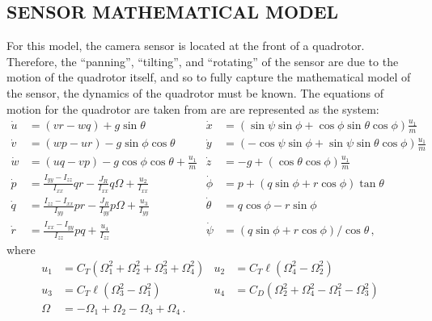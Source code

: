 \documentclass[11pt]{article}
\begin{document}
\subsection{SENSOR MATHEMATICAL MODEL}
For this model, the camera sensor is located at the front of a quadrotor. Therefore, the ``panning'', ``tilting'', and ``rotating'' of the sensor are due to the motion of the quadrotor itself, and so to fully capture the mathematical model of the sensor, the dynamics of the quadrotor must be known. The equations of motion for the quadrotor are taken from \cite{Ferrari20221IDPaC} are are represented as the system:
\begin{align}
    \dot u&=(vr-wq)+g\sin\theta & \dot x&=(\sin\psi\sin\phi+\cos\phi\sin\theta\cos\phi)\frac{u_1}{m}\nonumber\\
    \dot v&=(wp-ur)-g\sin\phi\cos\theta & \dot y&=(-\cos\psi\sin\phi+\sin\psi\sin\theta\cos\phi)\frac{u_1}{m}\nonumber\\
    \dot w&=(uq-vp)-g\cos\phi\cos\theta+\frac{u_1}{m} & \dot z&=-g+(\cos\theta\cos\phi)\frac{u_1}{m}\nonumber\\
    \dot p&=\frac{I_{yy}-I_{zz}}{I_{xx}}qr-\frac{J_R}{I_{xx}}q\Omega+\frac{u_2}{I_{xx}} & \dot\phi&=p+(q\sin\phi+r\cos\phi)\tan\theta\nonumber\\
    \dot q&=\frac{I_{zz}-I_{xx}}{I_{yy}}pr-\frac{J_R}{I_{yy}}p\Omega+\frac{u_3}{I_{yy}} & \dot\theta&=q\cos\phi-r\sin\phi\nonumber\\
    \dot r&=\frac{I_{xx}-I_{yy}}{I_{zz}}pq+\frac{u_4}{I_{zz}} & \dot\psi&=(q\sin\phi+r\cos\phi)/\cos\theta\,,\label{eqn:dynamics}
\end{align}
where
\begin{align}
    u_1&=C_T(\Omega_1^2+\Omega_2^2+\Omega_3^2+\Omega_4^2) & u_2&=C_T\ell(\Omega_4^2-\Omega_2^2)\nonumber\\
    u_3&=C_T\ell(\Omega_3^2-\Omega_1^2) & u_4&=C_D(\Omega_2^2+\Omega_4^2-\Omega_1^2-\Omega_3^2)\nonumber\\
    \Omega&=-\Omega_1+\Omega_2-\Omega_3+\Omega_4\,.\label{eqn:uforces}
\end{align}
\end{document}
